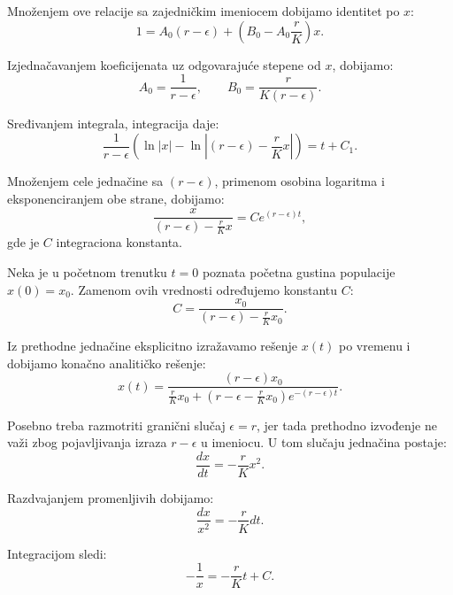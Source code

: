 \documentclass[12pt]{article}
\begin{document}
Množenjem ove relacije sa zajedničkim imeniocem dobijamo identitet po $x$:
\begin{equation}
1 = A_0(r - \epsilon) + \left(B_0 - A_0\frac{r}{K}\right)x.
\end{equation}

Izjednačavanjem koeficijenata uz odgovarajuće stepene od $x$, dobijamo:
\begin{equation}
A_0 = \frac{1}{r - \epsilon}, \qquad B_0 = \frac{r}{K(r - \epsilon)}.
\end{equation}

Sređivanjem integrala, integracija daje:
\begin{equation}
\frac{1}{r - \epsilon}\left(\ln|x| - \ln\left|(r - \epsilon) - \frac{r}{K}x\right|\right) = t + C_1.
\end{equation}

Množenjem cele jednačine sa $(r - \epsilon)$, primenom osobina logaritma i eksponenciranjem obe strane, dobijamo:
\begin{equation}
\frac{x}{(r - \epsilon) - \frac{r}{K}x} = C e^{(r - \epsilon)t},
\end{equation}
gde je $C$ integraciona konstanta.

Neka je u početnom trenutku $t=0$ poznata početna gustina populacije $x(0)=x_0$. Zamenom ovih vrednosti određujemo konstantu $C$:
\begin{equation}
C = \frac{x_0}{(r - \epsilon) - \frac{r}{K}x_0}.
\end{equation}

Iz prethodne jednačine eksplicitno izražavamo rešenje $x(t)$ po vremenu i dobijamo konačno analitičko rešenje:
\begin{equation}
x(t) = \frac{(r - \epsilon)x_0}{\frac{r}{K}x_0 + \left(r - \epsilon - \frac{r}{K}x_0\right)e^{-(r - \epsilon)t}}.
\end{equation}

Posebno treba razmotriti granični slučaj $\epsilon = r$, jer tada prethodno izvođenje ne važi zbog pojavljivanja izraza $r-\epsilon$ u imeniocu. U tom slučaju jednačina postaje:
\begin{equation}
\frac{dx}{dt} = -\frac{r}{K}x^2.
\end{equation}

Razdvajanjem promenljivih dobijamo:
\begin{equation}
\frac{dx}{x^2} = -\frac{r}{K}dt.
\end{equation}

Integracijom sledi:
\begin{equation}
-\frac{1}{x} = -\frac{r}{K}t + C.
\end{equation}
\end{document}
